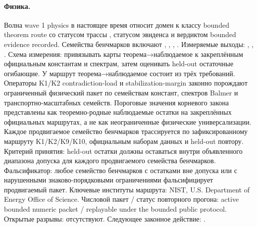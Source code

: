 \paragraph{Физика.}
Волна wave 1 physics в настоящее время относит домен к классу bounded theorem route со статусом трассы , статусом эвиденса  и вердиктом bounded evidence recorded.
Семейства бенчмарков включают , \allowbreak {}, \allowbreak {}, \allowbreak {}.
Измеряемые выходы: , \allowbreak {}, \allowbreak {}.
Схема измерения: привязывать карты теорема→наблюдаемое к закреплённым официальным константам и спектрам, затем оценивать held-out остаточные огибающие.
У маршрут теорема→наблюдаемое состоит из трёх требований. Операторы K1/K2 contradiction-load и stabilization-margin законно порождают ограниченный физический пакет по семействам констант, спектров Balmer и транспортно-масштабных семейств. Пороговые значения корневого закона представлены как теоремно-родные наблюдаемые остатки на закреплённых официальных маршрутах, а не как неограниченные физические универсализации. Каждое продвигаемое семейство бенчмарков трассируется по зафиксированному маршруту K1/K2/K9/K10, официальным наборам данных и held-out повтору.
Критерий принятия: held-out остатки должны оставаться внутри объявленного диапазона допуска для каждого продвигаемого семейства бенчмарков.
Фальсификатор: любое семейство бенчмарков с остатками вне допуска или с нарушенными знаково-порядковыми ограничениями фальсифицирует продвигаемый пакет.
Ключевые институты маршрута: NIST, \allowbreak U.S. Department of Energy Office of Science.
Числовой пакет / статус повторного прогона: active bounded numeric packet / replayable under the bounded public protocol.
Открытые разрывы: отсутствуют.
Следующее законное действие: .

